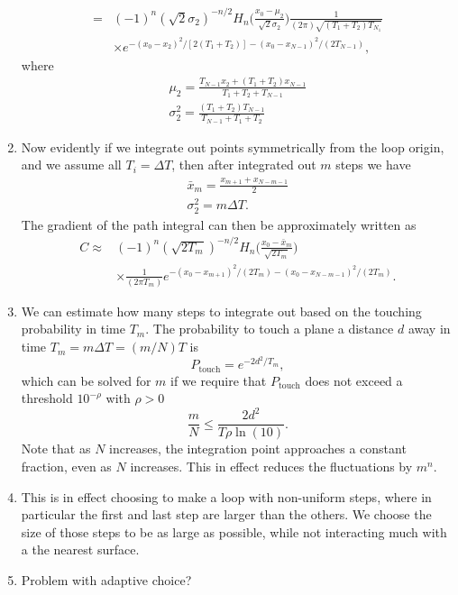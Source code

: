 \begin{enumerate}
\begin{align}
      =&(-1)^n(\sqrt{2}\sigma_2)^{-n/2}H_n\bigg(\frac{x_0-\mu_2}{\sqrt{2}\sigma_2}\bigg)
      \frac{1}{(2\pi)\sqrt{(T_1+T_2)T_{N_1}}}\nonumber\\
      &\times e^{-(x_0-x_2)^2/[2(T_1+T_2)]-(x_0-x_{N-1})^2/(2T_{N-1})},
    \end{align}
    where 
    \begin{gather}
      \mu_2 = \frac{T_{N-1}x_2+ (T_1+T_2)x_{N-1}}{T_1+T_2+T_{N-1}}\\
      \sigma_2^2 = \frac{(T_1+T_2)T_{N-1}}{T_{N-1}+T_1+T_2}
    \end{gather}
  \item Now evidently if we integrate out points symmetrically from the loop origin, and we 
    assume all $T_i=\Delta T$, then after integrated out $m$ steps we have 
    \begin{gather}
      \bar{x}_m = \frac{x_{m+1}+ x_{N-m-1}}{2}\\
      \sigma_2^2 = m\Delta T.
    \end{gather}
    The gradient of the path integral can then be approximately written as 
    \begin{align}
      C\approx
      &(-1)^n(\sqrt{2 T_m})^{-n/2}H_n\bigg(\frac{x_0-\bar{x}_m}{\sqrt{2 T_m}}\bigg)\nonumber\\
      &\times \frac{1}{(2\pi T_m)}e^{-(x_0-x_{m+1})^2/(2T_m)-(x_0-x_{N-m-1})^2/(2T_m)}.
    \end{align}
  \item We can estimate how many steps to integrate out based on the touching probability in time $T_m$.  
    The probability to touch a plane a distance $d$ away in time $T_m=m\Delta T = (m/N)T$ is 
    \begin{equation}
      P_{\text{touch}} = e^{-2d^2/T_m},
    \end{equation}
    which can be solved for $m$ if we require that $P_{\mathrm{touch}}$ does not exceed a threshold
    $10^{-\rho}$ with $\rho>0$  
    \begin{equation}
      \frac{m}{N} \le \frac{2d^2}{T\rho\ln(10)}.
    \end{equation}
    Note that as $N$ increases, the integration point approaches a constant fraction, even as $N$ increases.  
    This in effect reduces the fluctuations by $m^n$.  
    \item This is in effect choosing to make a loop with non-uniform steps, where in particular the first
    and last step are larger than the others.  We choose the size of those steps to be as 
    large as possible, while not interacting much with a the nearest surface.  

    \item Problem with adaptive choice?
\end{enumerate}

